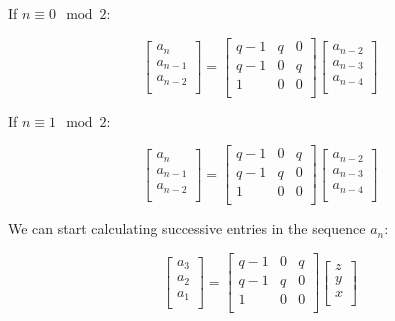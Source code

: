 \documentclass[paper.tex]{subfiles}
\begin{document}
If $n \equiv 0 \mod 2$:

\[
\left[ \begin{array}{ccc}
a_{n} \\
a_{n-1} \\
a_{n-2} \\
\end{array} \right]
=
\left[ \begin{array}{ccc}
q-1 & q & 0 \\
q-1 & 0 & q \\
1 & 0 & 0 \\
\end{array} \right]
\left[ \begin{array}{ccc}
a_{n-2} \\
a_{n-3} \\
a_{n-4} \\
\end{array} \right]
\]

If $n \equiv 1 \mod 2$:

\[
\left[ \begin{array}{ccc}
a_{n} \\
a_{n-1} \\
a_{n-2} \\
\end{array} \right]
=
\left[ \begin{array}{ccc}
q-1 & 0 & q \\
q-1 & q & 0 \\
1 & 0 & 0 \\
\end{array} \right]
\left[ \begin{array}{ccc}
a_{n-2} \\
a_{n-3} \\
a_{n-4} \\
\end{array} \right]
\]


We can start calculating successive entries in the sequence {$a_{n}$}:

\[
\left[ \begin{array}{ccc}
a_{3} \\
a_{2} \\
a_{1} \\
\end{array} \right]
=
\left[ \begin{array}{ccc}
q-1 & 0 & q \\
q-1 & q & 0 \\
1 & 0 & 0 \\
\end{array} \right]
\left[ \begin{array}{ccc}
z \\
y \\
x \\
\end{array} \right]
\]
\end{document}
